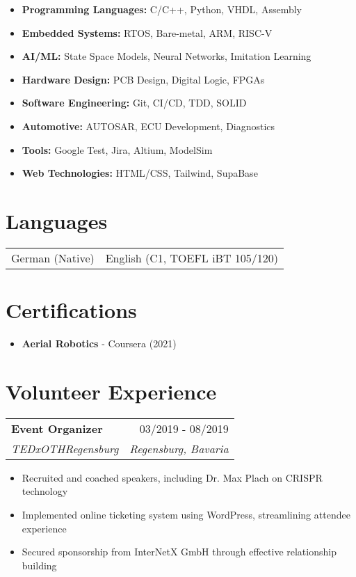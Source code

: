 \documentclass[letterpaper,11pt]{article}
\makeatletter
\newcommand{\entryspace}{\vspace{0.2em}}
\newcommand{\cventry}[4]{
  \begin{tabular*}{\textwidth}{l@{\extracolsep{\fill}}r}
    \textbf{#1} & \textcolor{secondary}{#2} \\
    \textcolor{accent}{\textit{#3}} & \textcolor{secondary}{\textit{#4}} \\
  \end{tabular*}\entryspace
}
\makeatother
\begin{document}
\begin{multicols}{2}
    \begin{itemize}[leftmargin=*, nosep]
        \item \textbf{Programming Languages:} C/C++, Python, VHDL, Assembly
        \item \textbf{Embedded Systems:} RTOS, Bare-metal, ARM, RISC-V
        \item \textbf{AI/ML:} State Space Models, Neural Networks, Imitation Learning
        \item \textbf{Hardware Design:} PCB Design, Digital Logic, FPGAs
        \item \textbf{Software Engineering:} Git, CI/CD, TDD, SOLID
        \item \textbf{Automotive:} AUTOSAR, ECU Development, Diagnostics
        \item \textbf{Tools:} Google Test, Jira, Altium, ModelSim
        \item \textbf{Web Technologies:} HTML/CSS, Tailwind, SupaBase
    \end{itemize}
\end{multicols}

\section{Languages}
\begin{tabular}{ll}
    German (Native) & English (C1, TOEFL iBT 105/120)
\end{tabular}

\section{Certifications}
\begin{itemize}[leftmargin=*, nosep]
    \item \textbf{Aerial Robotics} - Coursera (2021)
\end{itemize}

\section{Volunteer Experience}

\cventry{Event Organizer}{03/2019 - 08/2019}
{TEDxOTHRegensburg}{Regensburg, Bavaria}
\begin{itemize}[leftmargin=*, nosep]
    \item Recruited and coached speakers, including Dr. Max Plach on CRISPR technology
    \item Implemented online ticketing system using WordPress, streamlining attendee experience
    \item Secured sponsorship from InterNetX GmbH through effective relationship building
\end{itemize}
\end{document}
